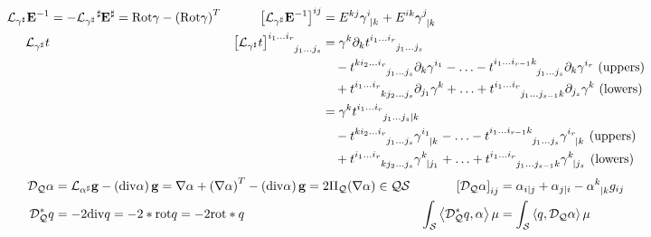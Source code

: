 \documentclass[a4paper,10pt]{scrartcl}
\newcommand{\surf}{\mathcal{S}}
\newcommand{\qts}{\mathcal{Q}\surf}
\newcommand{\rot}{\mathrm{rot}}
\renewcommand{\div}{\mathrm{div}}
\newcommand{\Rot}{\mathrm{Rot}}
\newcommand{\lie}{\mathcal{L}}
\newcommand{\dq}{\mathcal{D}_{\mathcal{Q}}}
\newcommand{\gb}{\mathbf{g}}
\newcommand{\Eb}{\mathbf{E}}
\begin{document}
\begin{align*}
  \lie_{\gamma^{\sharp}}\Eb^{-1} &= -\lie_{\gamma^{\sharp}}\tensor[^{\sharp}]{\Eb}{^{\sharp}} = \Rot\gamma - \left( \Rot\gamma \right)^{T}
        &\left[ \lie_{\gamma^{\sharp}}\Eb^{-1} \right]^{ij} &= E^{kj}\tensor{\gamma}{^{i}_{|k}} + E^{ik}\tensor{\gamma}{^{j}_{|k}}\\
  \lie_{\gamma^{\sharp}}t &
        &\tensor{\left[ \lie_{\gamma^{\sharp}}t \right]}{^{i_{1}\ldots i_{r}}_{j_{1}\ldots j_{s}}}
            &= \gamma^{k}\partial_{k}\tensor{t}{^{i_{1}\ldots i_{r}}_{j_{1}\ldots j_{s}}} \\
                        &&&\quad -\tensor{t}{^{ki_{2}\ldots i_{r}}_{j_{1}\ldots j_{s}}}\partial_{k}\gamma^{i_{1}}
                           - \ldots - \tensor{t}{^{i_{1}\ldots i_{r-1}k}_{j_{1}\ldots j_{s}}} \partial_{k}\gamma^{i_{r}} \text{ (uppers)}\\
                        &&&\quad +\tensor{t}{^{i_{1}\ldots i_{r}}_{kj_{2}\ldots j_{s}}}\partial_{j_{1}}\gamma^{k}
                           + \ldots + \tensor{t}{^{i_{1}\ldots i_{r}}_{j_{1}\ldots j_{s-1}k}}\partial_{j_{s}}\gamma^{k} \text{ (lowers)} \\
          &&&= \gamma^{k}\tensor{t}{^{i_{1}\ldots i_{r}}_{j_{1}\ldots j_{s}|k}} \\
                        &&&\quad -\tensor{t}{^{ki_{2}\ldots i_{r}}_{j_{1}\ldots j_{s}}}\tensor{\gamma}{^{i_{1}}_{|k}}
                          - \ldots - \tensor{t}{^{i_{1}\ldots i_{r-1}k}_{j_{1}\ldots j_{s}}}\tensor{\gamma}{^{i_{r}}_{|k}}  \text{ (uppers)}\\
                        &&&\quad +\tensor{t}{^{i_{1}\ldots i_{r}}_{kj_{2}\ldots j_{s}}}\tensor{\gamma}{^{k}_{|j_{1}}}
                           + \ldots + \tensor{t}{^{i_{1}\ldots i_{r}}_{j_{1}\ldots j_{s-1}k}}\tensor{\gamma}{^{k}_{|j_{s}}} \text{ (lowers)}
\end{align*}
\begin{align*}
  \dq\alpha &= \lie_{\alpha^{\sharp}}\gb - \left(\div\alpha\right)\gb 
              = \nabla\alpha + \left( \nabla\alpha \right)^{T} - \left(\div\alpha\right)\gb 
              = 2\Pi_{\mathcal{Q}}(\nabla\alpha) \in \qts
        &\left[\dq\alpha  \right]_{ij} &= \alpha_{i|j} + \alpha_{j|i} - \tensor{\alpha}{^{k}_{|k}}g_{ij}\\
  \dq^{*} q &= -2 \div q = - 2*\rot q = -2 \rot *q
          &\int_{\surf} \left\langle \dq^{*}q , \alpha \right\rangle \mu &= \int_{\surf} \left\langle q , \dq\alpha \right\rangle \mu
\end{align*}
  
\end{document}

